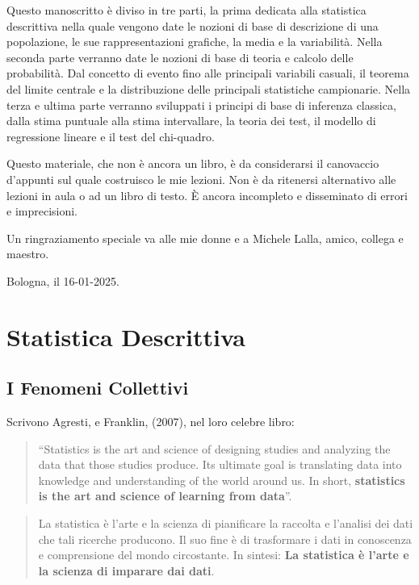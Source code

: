 \documentclass[
  11pt,
]{book}
\theoremstyle{mytheoremstyle}
\theoremstyle{mydefstyle}
\begin{document}
Questo manoscritto è diviso in tre parti, la prima dedicata alla statistica descrittiva nella quale
vengono date le nozioni di base di descrizione di una popolazione, le sue rappresentazioni grafiche,
la media e la variabilità. Nella seconda parte verranno date le nozioni di base di teoria e calcolo delle probabilità.
Dal concetto di evento fino alle principali variabili casuali, il teorema del limite centrale e la distribuzione
delle principali statistiche campionarie. Nella terza e ultima parte verranno sviluppati
i principi di base di inferenza classica, dalla stima puntuale alla stima intervallare, la teoria dei test,
il modello di regressione lineare e il test del chi-quadro.

Questo materiale, che non è ancora un libro, è da considerarsi il canovaccio d'appunti sul quale
costruisco le mie lezioni. Non è da ritenersi alternativo alle lezioni in aula o ad un libro di testo.
È ancora incompleto e disseminato di errori e imprecisioni.

Un ringraziamento speciale va alle mie donne e a Michele Lalla, amico, collega e maestro.

Bologna, il 16-01-2025.

\part{Statistica Descrittiva}

\chapter{I Fenomeni Collettivi}\label{i-fenomeni-collettivi}

Scrivono Agresti, e Franklin, (2007), nel loro celebre libro:

\begin{quote}
``Statistics is the art and science of designing studies and analyzing the data that those studies produce. Its ultimate goal is translating data into knowledge and understanding of the world around us. In short, \textbf{statistics is the art and science of learning from data}''.
\end{quote}

\begin{quote}
La statistica è l'arte e la scienza di pianificare la raccolta e l'analisi dei dati che tali ricerche producono. Il suo fine è di trasformare i dati in conoscenza e comprensione del mondo circostante. In sintesi: \textbf{La statistica è l'arte e la scienza di imparare dai dati}.
\end{quote}
\end{document}
